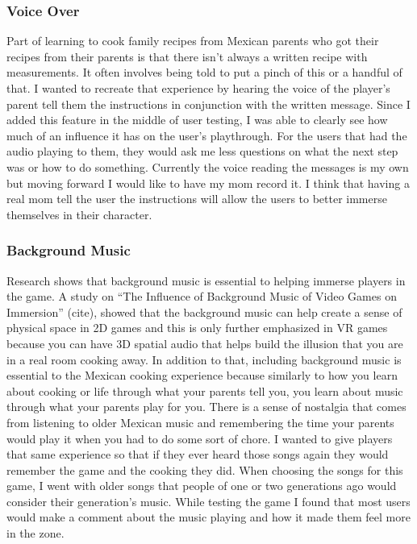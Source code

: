 \documentclass[10pt,twocolumn]{article}
\begin{document}
\subsubsection{Voice Over}
Part of learning to cook family recipes from Mexican parents who got their recipes from their parents is that there isn’t always a written recipe with measurements. It often involves being told to put a pinch of this or a handful of that. I wanted to recreate that experience by hearing the voice of the player’s parent tell them the instructions in conjunction with the written message. Since I added this feature in the middle of user testing, I was able to clearly see how much of an influence it has on the user’s playthrough. For the users that had the audio playing to them, they would ask me less questions on what the next step was or how to do something. Currently the voice reading the messages is my own but moving forward I would like to have my mom record it. I think that having a real mom tell the user the instructions will allow the users to better immerse themselves in their character. 

\subsubsection{Background Music}
Research shows that background music is essential to helping immerse players in the game. A study on “The Influence of Background Music of Video Games on Immersion” (cite), showed that the background music can help create a sense of physical space in 2D games and this is only further emphasized in VR games because you can have 3D spatial audio that helps build the illusion that you are in a real room cooking away. In addition to that, including background music is essential to the Mexican cooking experience because similarly to how you learn about cooking or life through what your parents tell you, you learn about music through what your parents play for you. There is a sense of nostalgia that comes from listening to older Mexican music and remembering the time your parents would play it when you had to do some sort of chore. I wanted to give players that same experience so that if they ever heard those songs again they would remember the game and the cooking they did. When choosing the songs for this game, I went with older songs that people of one or two generations ago would consider their generation’s music. While testing the game I found that most users would make a comment about the music playing and how it made them feel more in the zone. 
\end{document}
